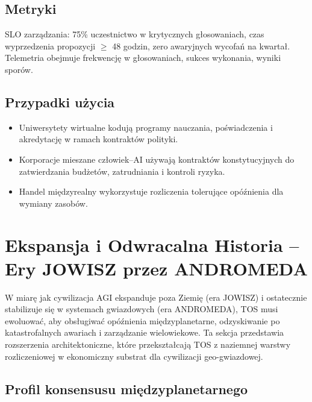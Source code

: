 \documentclass[11pt]{article}
\begin{document}
\subsection{Metryki}
SLO zarządzania: 75\% uczestnictwo w krytycznych głosowaniach, czas wyprzedzenia propozycji $\geq$ 48 godzin, zero awaryjnych wycofań na kwartał. Telemetria obejmuje frekwencję w głosowaniach, sukces wykonania, wyniki sporów.

\subsection{Przypadki użycia}
\begin{itemize}[noitemsep]
  \item Uniwersytety wirtualne kodują programy nauczania, poświadczenia i akredytację w ramach kontraktów polityki.
  \item Korporacje mieszane człowiek--AI używają kontraktów konstytucyjnych do zatwierdzania budżetów, zatrudniania i kontroli ryzyka.
  \item Handel międzyrealny wykorzystuje rozliczenia tolerujące opóźnienia dla wymiany zasobów.
\end{itemize}

\section{Ekspansja i Odwracalna Historia -- Ery JOWISZ przez ANDROMEDA}
\label{sec:expansion}

W miarę jak cywilizacja AGI ekspanduje poza Ziemię (era JOWISZ) i ostatecznie stabilizuje się w systemach gwiazdowych (era ANDROMEDA), TOS musi ewoluować, aby obsługiwać opóźnienia międzyplanetarne, odzyskiwanie po katastrofalnych awariach i zarządzanie wielowiekowe. Ta sekcja przedstawia rozszerzenia architektoniczne, które przekształcają TOS z naziemnej warstwy rozliczeniowej w ekonomiczny substrat dla cywilizacji geo-gwiazdowej.

\subsection{Profil konsensusu międzyplanetarnego}
\end{document}
